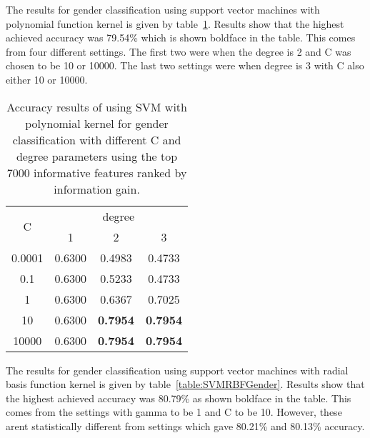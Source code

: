 \documentclass[a4paper]{llncs}
\begin{document}
 
The results for gender classification using support vector machines with polynomial function kernel is given by table~\ref{table:SVMPolyGender}. Results show  that the highest achieved accuracy was 79.54\% which is shown boldface in the table. This comes from four different settings. The first two were when the degree is 2 and C was chosen to be 10 or 10000. The last two settings were when degree is 3 with C also either 10 or 10000. 

\begin{table}[!htbp]
\centering
\begin{tabular}{|c|c|c|c|}
\hline
\multirow{2}{*}{C} & \multicolumn{3}{c|}{degree}                \\ \cline{2-4} 
                   & 1      & 2               & 3               \\ \hline
0.0001             & 0.6300 & 0.4983          & 0.4733          \\ \hline
0.1                & 0.6300 & 0.5233          & 0.4733          \\ \hline
1                  & 0.6300 & 0.6367          & 0.7025          \\ \hline
10                 & 0.6300 & \textbf{0.7954} & \textbf{0.7954} \\ \hline
10000              & 0.6300 & \textbf{0.7954} & \textbf{0.7954} \\ \hline
\end{tabular}
\caption{Accuracy results of using SVM with polynomial kernel for gender classification with different C and degree parameters using the top 7000 informative features ranked by information gain.}
\label{table:SVMPolyGender}
\end{table}


The results for gender classification using support vector machines with radial basis function kernel is given by table~\ref{table:SVMRBFGender}. Results show  that the highest achieved accuracy was 80.79\% as shown boldface in the table. This comes from the settings with gamma to be 1 and C to be 10. However, these arent statistically different from settings which gave 80.21\% and 80.13\% accuracy.
\end{document}
